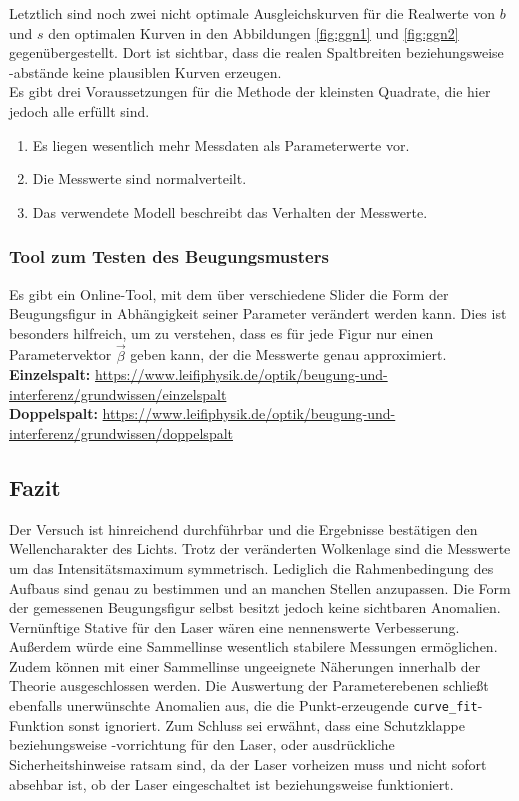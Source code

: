 Letztlich sind noch zwei nicht optimale Ausgleichskurven für die Realwerte von $b$ und $s$ den optimalen Kurven in den Abbildungen \ref{fig:ggn1} und \ref{fig:ggn2} gegenübergestellt.
Dort ist sichtbar, dass die realen Spaltbreiten beziehungsweise -abstände keine plausiblen Kurven erzeugen. \\

Es gibt drei Voraussetzungen für die Methode der kleinsten Quadrate, die hier jedoch alle erfüllt sind.
\begin{enumerate}
    \item Es liegen wesentlich mehr Messdaten als Parameterwerte vor.
    \item Die Messwerte sind normalverteilt.
    \item Das verwendete Modell beschreibt das Verhalten der Messwerte.
\end{enumerate}

\subsubsection{Tool zum Testen des Beugungsmusters}
Es gibt ein Online-Tool, mit dem über verschiedene Slider die Form der Beugungsfigur in Abhängigkeit seiner Parameter verändert werden kann.
Dies ist besonders hilfreich, um zu verstehen, dass es für jede Figur nur einen Parametervektor $\vec{\beta}$ geben kann, der die Messwerte genau approximiert.\\
\textbf{Einzelspalt:} \url{https://www.leifiphysik.de/optik/beugung-und-interferenz/grundwissen/einzelspalt}\\
\textbf{Doppelspalt:} \url{https://www.leifiphysik.de/optik/beugung-und-interferenz/grundwissen/doppelspalt}

\subsection{Fazit}
Der Versuch ist hinreichend durchführbar und die Ergebnisse bestätigen den Wellencharakter des Lichts.
Trotz der veränderten Wolkenlage sind die Messwerte um das Intensitätsmaximum symmetrisch.
Lediglich die Rahmenbedingung des Aufbaus sind genau zu bestimmen und an manchen Stellen anzupassen. Die Form der gemessenen Beugungsfigur selbst besitzt jedoch keine sichtbaren Anomalien.
Vernünftige Stative für den Laser wären eine nennenswerte Verbesserung. Außerdem würde eine Sammellinse wesentlich stabilere Messungen ermöglichen. Zudem können mit einer Sammellinse ungeeignete Näherungen innerhalb der Theorie ausgeschlossen werden.
Die Auswertung der Parameterebenen schließt ebenfalls unerwünschte Anomalien aus, die die Punkt-erzeugende \texttt{curve\_fit}-Funktion sonst ignoriert. 
Zum Schluss sei erwähnt, dass eine Schutzklappe beziehungsweise -vorrichtung für den Laser, oder ausdrückliche Sicherheitshinweise ratsam sind, da der Laser vorheizen muss und nicht sofort absehbar ist, ob der Laser eingeschaltet
ist beziehungsweise funktioniert.